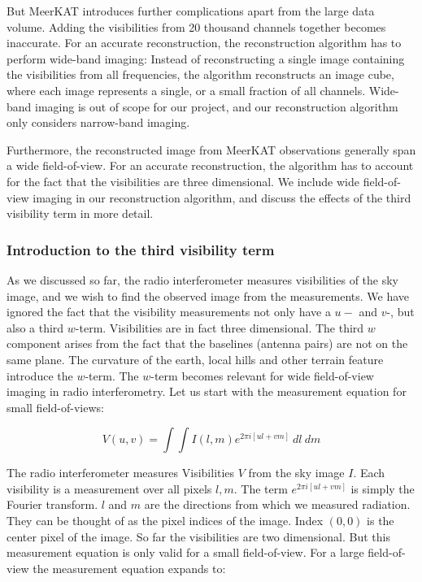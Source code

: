But MeerKAT introduces further complications apart from the large data volume. Adding the visibilities from 20 thousand channels together becomes inaccurate. For an accurate reconstruction, the reconstruction algorithm has to perform wide-band imaging: Instead of reconstructing a single image containing the visibilities from all frequencies, the algorithm reconstructs an image cube, where each image represents a single, or a small fraction of all channels. Wide-band imaging is out of scope for our project, and our reconstruction algorithm only considers narrow-band imaging.

Furthermore, the reconstructed image from MeerKAT observations generally span a wide field-of-view. For an accurate reconstruction, the algorithm has to account for the fact that the visibilities are three dimensional. We include wide field-of-view imaging in our reconstruction algorithm, and discuss the effects of the third visibility term in more detail.


\subsubsection{Introduction to the third visibility term}
As we discussed so far, the radio interferometer measures visibilities of the sky image, and we wish to find the observed image from the measurements. We have ignored the fact that the visibility measurements not only have a $u-$ and $v$-, but also a third $w$-term. Visibilities are in fact three dimensional. The third $w$ component arises from the fact that the baselines (antenna pairs) are not on the same plane. The curvature of the earth, local hills and other terrain feature introduce the $w$-term. The $w$-term becomes relevant for wide field-of-view imaging in radio interferometry. Let us start with the measurement equation for small field-of-views:

\begin{equation}\label{intro2:model:smallfov}
V(u, v) = \int\int I(l, m)  e^{2 \pi i [ul+vm]} \: dl \: dm
\end{equation}

The radio interferometer measures Visibilities $V$ from the sky image $I$. Each visibility is a measurement over all pixels $l, m$. The term $ e^{2 \pi i [ul+vm]}$ is simply the Fourier transform. $l$ and $m$ are the directions from which we measured radiation. They can be thought of as the pixel indices of the image. Index $(0,0)$ is the center pixel of the image. So far the visibilities are two dimensional. But this measurement equation is only valid for a small field-of-view. For a large field-of-view the measurement equation expands to:


